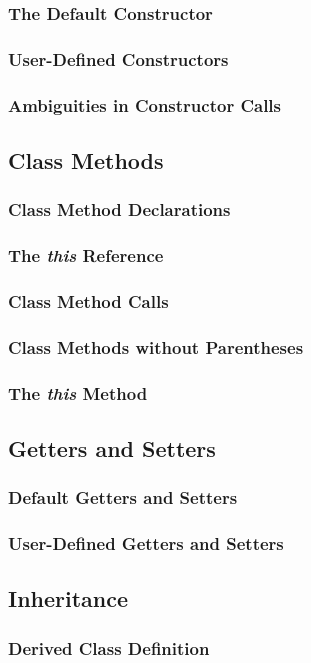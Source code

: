 \documentclass[10pt,twoside,titlepage]{article}
\begin{document}
\subsubsection{The Default Constructor}
\subsubsection{User-Defined Constructors}
\subsubsection{Ambiguities in Constructor Calls}
\subsection{Class Methods}
\subsubsection{Class Method Declarations}
\subsubsection{The {\em this} Reference}
\subsubsection{Class Method Calls}
\subsubsection{Class Methods without Parentheses}
\subsubsection{The {\em this} Method}
\subsection{Getters and Setters}
\subsubsection{Default Getters and Setters}
\subsubsection{User-Defined Getters and Setters}
\subsection{Inheritance}
\subsubsection{Derived Class Definition}
\end{document}
